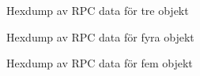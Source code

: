 \begin{figure}
    \scriptsize
    \center
    
    \caption{Hexdump av RPC data för tre objekt}
    \label{fig:tim-rpcdata3}
\end{figure}

\begin{figure}
    \scriptsize
    \center
    
    \caption{Hexdump av RPC data för fyra objekt}
    \label{fig:tim-rpcdata4}
\end{figure}

\begin{figure}
    \scriptsize
    \center
    
    \caption{Hexdump av RPC data för fem objekt}
    \label{fig:tim-rpcdata5}
\end{figure}
